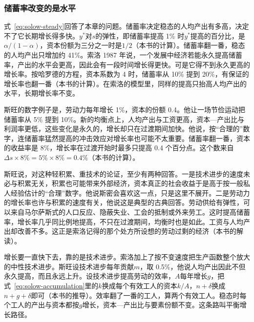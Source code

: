 \subsubsection{储蓄率改变的是水平}

式~\eqref{eq:solow-steady}回答了本章的问题。储蓄率决定稳态的人均产出有多高，决定不了它长期增长得多快。$y^{*}$对$s$的弹性，即储蓄率提高 1\% 时$y^{*}$提高的百分比，是$\alpha/(1-\alpha)$，资本份额为三分之一时是$1/2$（本书的计算）。储蓄率翻一番，稳态的人均产出只增加约 41\%。索洛 1987 年说，一个发展中经济若能永久提高储蓄率，产出的水平会更高，因此会有一段时间增长得更快\cite{solow1987}。可是它得不到永久更高的增长率\cite{solow1987}。按哈罗德的方程，资本系数为 4 时，储蓄率从 10\% 提到 20\%，有保证的增长率也翻一番（本书的计算）。在索洛的模型里，同样的提高只抬高人均产出的水平，长期增长率不变。

斯旺的数字例子是，劳动力每年增长 1\%，资本的份额 0.4\cite{swan1956}。他让一场节俭运动把储蓄率从 5\% 提到 10\%\cite{swan1956}。新的均衡点上，人均产出与工资更高，资本—产出比与利润率更低，这些变化是永久的，增长却只在过渡期间加快\cite{swan1956}。他说，按“合理的”数字，连储蓄率猛然提高的冲击效应对增长率也可能不太重要\cite{swan1956}。储蓄率翻一番，资本的收益率是 8\%，增长率在过渡开始时最多只提高 0.4 个百分点\cite{swan1956}。这个数来自$\Delta s\times8\%=5\%\times8\%=0.4\%$（本书的计算）。

斯旺说，对这种轻积累、重技术的论证，至少有两种回答\cite{swan1956}。一是技术进步的速度未必与积累无关，积累也可能带来外部经济，资本真正的社会收益于是高于按一般私人经验估计的“合理”数字。他说斯密会喜欢这一点，只是这里不展开\cite{swan1956}。二是劳动力的增长率也许与积累的速度有关，他说这是典型的古典回答\cite{swan1956}。劳动供给有弹性，可以来自马尔萨斯式的人口反应、隐蔽失业、工会的抵制或外来劳工\cite{swan1956}。这时提高储蓄率，增长率几乎同比例地提高，不只在过渡期间，均衡时也是如此\cite{swan1956}。工资与人均产出却改善不多\cite{swan1956}。这正是索洛记得的那个处方所设想的劳动过剩的经济（本书的解读）。

增长要一直快下去，靠的是技术进步。索洛加上了按不变速度把生产函数整个放大的中性技术进步\cite{solow1956}。斯旺设技术进步每年贡献$m$，取 0.5\%，他说人均产出因此不但永久提高，而且永远上升\cite{swan1956}。设技术进步提高劳动的效率，$A$每年增长$g$，把式~\eqref{eq:solow-accumulation}里的$k$换成每个有效工人的资本$k/A$，$n+\delta$换成$n+g+\delta$即可（本书的推导）。效率翻了一番的工人，算两个有效工人。稳态时每个工人的产出与资本都按$g$增长，资本—产出比与要素份额不变。这条路叫平衡增长路径。

